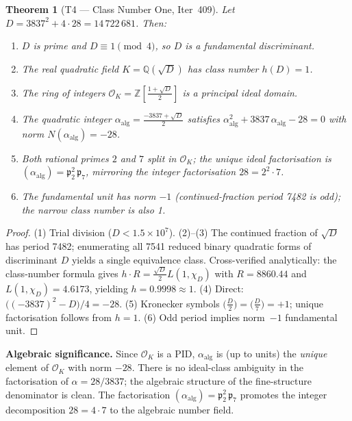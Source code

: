 \documentclass[aps,prd,twocolumn,superscriptaddress,floatfix,nofootinbib]{revtex4-2}
\newtheorem{theorem}{Theorem}
\theoremstyle{definition}
\theoremstyle{remark}
\begin{document}
\begin{theorem}[T4 --- Class Number One, Iter~409]
Let $D = 3837^2 + 4\cdot 28 = 14\,722\,681$.  Then:
\begin{enumerate}[label=(\arabic*)]
  \item $D$ is prime and $D \equiv 1 \pmod{4}$, so $D$ is a fundamental
        discriminant.
  \item The real quadratic field $K = \mathbb{Q}(\sqrt{D})$ has class number
        $h(D) = 1$.
  \item The ring of integers $\mathcal{O}_K = \mathbb{Z}\!\left[\tfrac{1+\sqrt{D}}{2}\right]$
        is a principal ideal domain.
  \item The quadratic integer $\alpha_{\mathrm{alg}} = \tfrac{-3837+\sqrt{D}}{2}$
        satisfies $\alpha_{\mathrm{alg}}^2 + 3837\,\alpha_{\mathrm{alg}} - 28 = 0$
        with norm $N(\alpha_{\mathrm{alg}}) = -28$.
  \item Both rational primes $2$ and $7$ split in $\mathcal{O}_K$; the unique
        ideal factorisation is
        $(\alpha_{\mathrm{alg}}) = \mathfrak{p}_2^2\,\mathfrak{p}_7$,
        mirroring the integer factorisation $28 = 2^2\cdot 7$.
  \item The fundamental unit has norm $-1$ (continued-fraction period 7482 is odd);
        the narrow class number is also 1.
\end{enumerate}
\end{theorem}
\begin{proof}
(1) Trial division ($D < 1.5\times10^7$).  (2)--(3) The continued fraction of
$\sqrt{D}$ has period 7482; enumerating all 7541 reduced binary quadratic forms
of discriminant $D$ yields a single equivalence class.  Cross-verified
analytically: the class-number formula gives $h \cdot R = \tfrac{\sqrt{D}}{2}L(1,\chi_D)$
with $R = 8860.44$ and $L(1,\chi_D) = 4.6173$, yielding $h = 0.9998 \approx 1$.
(4) Direct: $\bigl((-3837)^2 - D\bigr)/4 = -28$.  (5) Kronecker symbols
$\bigl(\tfrac{D}{2}\bigr) = \bigl(\tfrac{D}{7}\bigr) = +1$; unique factorisation
follows from $h=1$.  (6) Odd period implies norm~$-1$ fundamental unit.
\end{proof}

\textbf{Algebraic significance.}  Since $\mathcal{O}_K$ is a PID,
$\alpha_{\mathrm{alg}}$ is (up to units) the \emph{unique} element of
$\mathcal{O}_K$ with norm $-28$.  There is no ideal-class ambiguity in
the factorisation of $\alpha = 28/3837$; the algebraic structure of the
fine-structure denominator is clean.  The factorisation
$(\alpha_{\mathrm{alg}}) = \mathfrak{p}_2^2\,\mathfrak{p}_7$ promotes the
integer decomposition $28 = 4\cdot 7$ to the algebraic number field.
\end{document}

